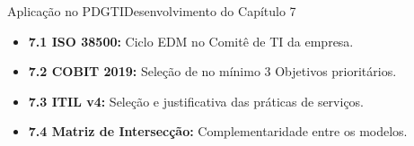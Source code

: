 \begin{senaiframe}{Aplicação no PDGTI}{Desenvolvimento do Capítulo 7}
  \vspace{0.5cm}
  \begin{tcolorbox}[senaigreencard, title={Capítulo 7 – Seleção e Justificativa de Frameworks}]
    \begin{itemize}
      \item \textbf{7.1 ISO 38500:} Ciclo EDM no Comitê de TI da empresa.
      \item \textbf{7.2 COBIT 2019:} Seleção de no mínimo 3 Objetivos prioritários.
      \item \textbf{7.3 ITIL v4:} Seleção e justificativa das práticas de serviços.
      \item \textbf{7.4 Matriz de Intersecção:} Complementaridade entre os modelos.
    \end{itemize}
  \end{tcolorbox}
\end{senaiframe}

